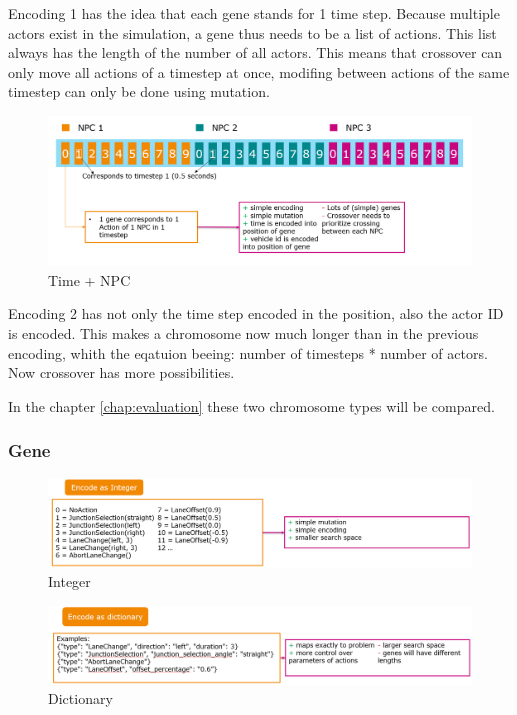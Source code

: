 Encoding 1 has the idea that each gene stands for 1 time step. Because multiple actors exist in the simulation, a gene thus needs to be a list of actions. This list always has the length of the number of all actors. This means that crossover can only move all actions of a timestep at once, modifing between actions of the same timestep can only be done using mutation.

\begin{figure}[ht] 
	\includegraphics[width=1\linewidth]{figures/time_npc_encoding}
	\caption{Time + NPC}
	\label{figure:encoding:chromosome:time_npc}
\end{figure}

Encoding 2 has not only the time step encoded in the position, also the actor ID is encoded. This makes a chromosome now much longer than in the previous encoding, whith the eqatuion beeing: number of timesteps * number of actors. Now crossover has more possibilities.

In the chapter \ref{chap:evaluation} these two chromosome types will be compared.


\subsubsection{Gene}

\begin{figure}[ht] 
	\includegraphics[width=1\linewidth]{figures/int_encoding}
	\caption{Integer}
	\label{figure:encoding:gene:int}
\end{figure}
\begin{figure}[ht] 
	\includegraphics[width=1\linewidth]{figures/dict_encoding}
	\caption{Dictionary}
	\label{figure:encoding:gene:dict}
\end{figure}

